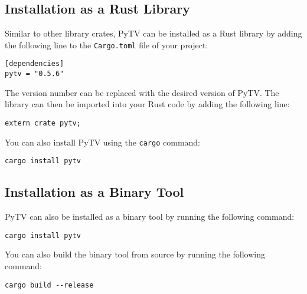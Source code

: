 \subsection{Installation as a Rust Library}
Similar to other library crates, PyTV can be installed as a Rust library by adding the following line to the \texttt{Cargo.toml} file of your project:
\begin{verbatim}
[dependencies]
pytv = "0.5.6"
\end{verbatim}
The version number can be replaced with the desired version of PyTV.
The library can then be imported into your Rust code by adding the following line:
\begin{verbatim}
extern crate pytv;
\end{verbatim}

You can also install PyTV using the \texttt{cargo} command:
\begin{verbatim}
cargo install pytv
\end{verbatim}

\subsection{Installation as a Binary Tool}
PyTV can also be installed as a binary tool by running the following command:
\begin{verbatim}
cargo install pytv
\end{verbatim}

You can also build the binary tool from source by running the following command:
\begin{verbatim}
cargo build --release
\end{verbatim}
